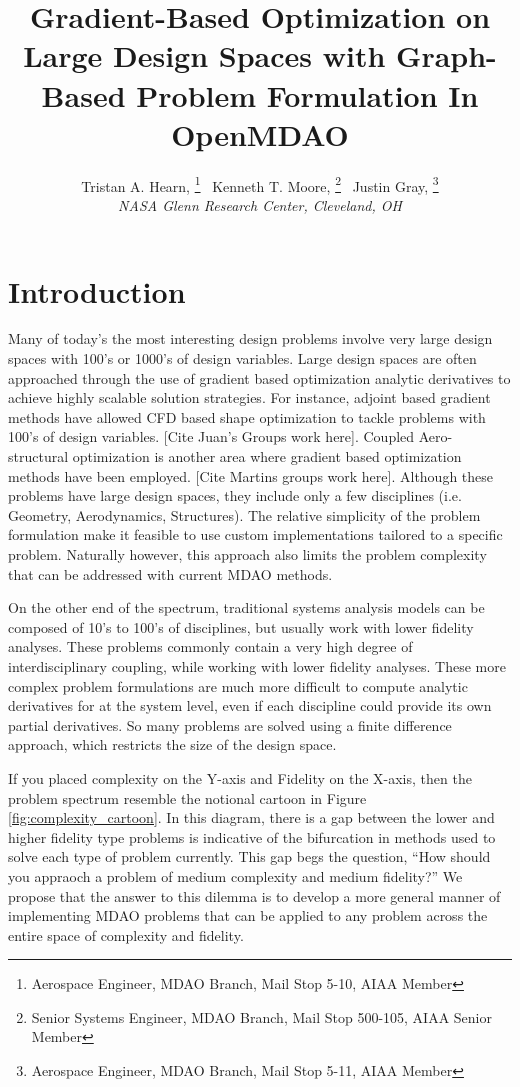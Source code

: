 \documentclass[]{aiaa-tc} %
\title{Gradient-Based Optimization on Large Design Spaces with Graph-Based Problem Formulation In OpenMDAO}
\author{
  Tristan A. Hearn,%
     \thanks{Aerospace Engineer, MDAO Branch, Mail Stop 5-10, AIAA Member}
  \ Kenneth T. Moore,%
     \thanks{Senior Systems Engineer, MDAO Branch, Mail Stop 500-105, AIAA Senior Member} 
  \ Justin Gray,%
     \thanks{Aerospace Engineer, MDAO Branch, Mail Stop 5-11, AIAA Member}
   \\
  {\normalsize\itshape
  NASA Glenn Research Center, Cleveland, OH}  \\
 }
\begin{document}
  \maketitle
   
  \begin{abstract}

  \end{abstract}

  \section{Introduction}

    Many of today's the most interesting design problems involve very large design spaces with 100's or 1000's of 
    design variables. Large design spaces are often approached through the use of gradient based optimization 
    analytic derivatives to achieve highly scalable solution strategies. For instance, adjoint based gradient 
    methods have allowed CFD based shape optimization to tackle problems with 100's of design variables. [Cite Juan's Groups
    work here]. Coupled Aero-structural optimization is another area where gradient based optimization methods have 
    been employed. [Cite Martins groups work here]. Although these problems have large design spaces, 
    they include only a few disciplines (i.e. Geometry, Aerodynamics, Structures). The relative simplicity of 
    the problem formulation make it feasible to use custom implementations tailored to a specific problem. Naturally however, 
    this approach also limits the problem complexity that can be addressed with current MDAO methods. 

    On the other end of the spectrum, traditional systems analysis models can be composed of 10's to 100's of disciplines, 
    but usually work with lower fidelity analyses. These problems commonly contain a very high degree of interdisciplinary 
    coupling, while working with lower fidelity analyses. These more complex problem formulations are much more difficult to compute 
    analytic derivatives for at the system level, even if each discipline could provide its own partial derivatives. So many 
    problems are solved using a finite difference approach, which restricts the size of the design space. 

    If you placed complexity on the Y-axis and Fidelity on the X-axis, then the problem spectrum resemble the notional 
    cartoon in Figure \ref{fig:complexity_cartoon}. In this diagram, there is a gap between the lower and higher fidelity 
    type problems is indicative of the bifurcation in methods used to solve each type of problem currently. This gap begs the 
    question, ``How should you appraoch a problem of medium complexity and medium fidelity?'' We propose that the answer to this
    dilemma is to develop a more general manner of implementing MDAO problems that can be applied to any problem across the entire 
    space of complexity and fidelity.  
\end{document}
